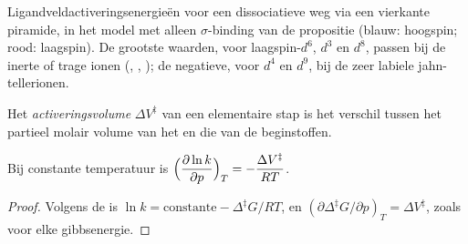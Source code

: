 \begin{omfigure}

{\small Ligandveldactiveringsenergieën voor een dissociatieve weg via een
vierkante piramide, in het model met alleen $\sigma$-binding van de propositie (blauw: hoogspin;
rood: laagspin). De grootste waarden,
voor laagspin-$d^6$, $d^3$ en $d^8$, passen bij de inerte of trage ionen (, , );
de negatieve, voor $d^4$ en $d^9$, bij de zeer labiele jahn-tellerionen.}
\end{omfigure}

\begin{definition}[Activeringsvolume]\label{def:b3:complex-mechanisms:activation-volume}
Het \emph{activeringsvolume} $\Delta V^{\ddagger}$ van een elementaire
stap is het verschil tussen het partieel molair volume van het
 en die van de beginstoffen.
\end{definition}

\begin{proposition}\label{prop:b3:complex-mechanisms:pressure}
Bij constante temperatuur is $\displaystyle\Bigl(\frac{\partial\ln k}{\partial p}\Bigr)_T = -\frac{\Delta V^{\ddagger}}{RT}$.
\end{proposition}

\begin{proof}
Volgens de  is $\ln k = \text{constante} - \Delta^{\ddagger}G/RT$, en $(\partial\Delta^{\ddagger}G/\partial p)_T = \Delta V^{\ddagger}$, zoals voor
elke gibbsenergie.
\end{proof}

